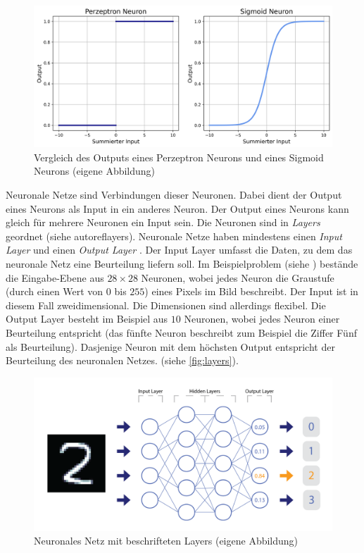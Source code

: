 \begin{figure}[!ht]
    \centering
    \includegraphics[width=\textwidth]{images/theorie/percep-v-sig.png}
    \caption{Vergleich des Outputs eines Perzeptron Neurons und eines Sigmoid Neurons (eigene Abbildung)}
    \label{fig:percep-v-sig}
\end{figure}

Neuronale Netze sind Verbindungen dieser Neuronen. Dabei dient der Output eines
Neurons als Input in ein anderes Neuron. Der Output eines Neurons kann gleich
für mehrere Neuronen ein Input sein. Die Neuronen sind in \emph{Layers} geordnet
(siehe autoref{layers}). Neuronale Netze haben mindestens einen \emph{Input
Layer} und einen \emph{Output Layer}
\cite{nielsen_neural_2015}\cite{ognjanovski_everything_2020}. Der Input Layer
umfasst die Daten, zu dem das neuronale Netz eine Beurteilung liefern soll. Im
Beispielproblem (siehe ) bestände die Eingabe-Ebene aus
$28\times28$ Neuronen, wobei jedes Neuron die Graustufe (durch einen Wert von
$0$ bis $255$) eines Pixels im Bild beschreibt. Der Input ist in diesem Fall
zweidimensional. Die Dimensionen sind allerdings flexibel. Die Output Layer
besteht im Beispiel aus $10$ Neuronen, wobei jedes Neuron einer Beurteilung
entspricht (das fünfte Neuron beschreibt zum Beispiel die Ziffer Fünf als
Beurteilung). Dasjenige Neuron mit dem höchsten Output entspricht der
Beurteilung des neuronalen Netzes. (siehe \autoref{fig:layers}).

\begin{figure}[!ht]
    \centering
    \includegraphics[width=\textwidth]{images/theorie/layers.png}
    \caption{Neuronales Netz mit beschrifteten Layers (eigene Abbildung)}
    \label{fig:layers}
\end{figure}


